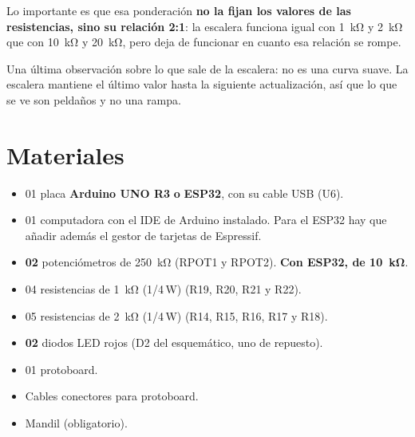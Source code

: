 \documentclass[11pt,a4paper]{article}
\begin{document}
Lo importante es que esa ponderación \textbf{no la fijan los valores de las
resistencias, sino su relación \num{2}:\num{1}}: la escalera funciona igual con
\qty{1}{\kilo\ohm} y \qty{2}{\kilo\ohm} que con \qty{10}{\kilo\ohm} y
\qty{20}{\kilo\ohm}, pero deja de funcionar en cuanto esa relación se rompe.

Una última observación sobre lo que sale de la escalera: no es una curva suave. La escalera mantiene el último valor hasta la siguiente actualización, así que
lo que se ve son peldaños y no una rampa.

\FloatBarrier
\section{Materiales}
\begin{itemize}
    \item 01 placa \textbf{Arduino UNO R3} \textbf{o} \textbf{ESP32}, con su cable
          USB (U6).
    \item 01 computadora con el IDE de Arduino instalado. Para el ESP32 hay que
          añadir además el gestor de tarjetas de Espressif.
    \item \textbf{02} potenciómetros de \qty{250}{\kilo\ohm} (RPOT1 y RPOT2).
          \textbf{Con ESP32, de \qty{10}{\kilo\ohm}}.
    \item 04 resistencias de \qty{1}{\kilo\ohm} (1/4\,\unit{\watt})
          (R19, R20, R21 y R22).
    \item 05 resistencias de \qty{2}{\kilo\ohm} (1/4\,\unit{\watt})
          (R14, R15, R16, R17 y R18).
    \item \textbf{02} diodos LED rojos (D2 del esquemático, uno de repuesto).
    \item 01 protoboard.
    \item Cables conectores para protoboard.
    \item Mandil (obligatorio).
\end{itemize}
\end{document}
